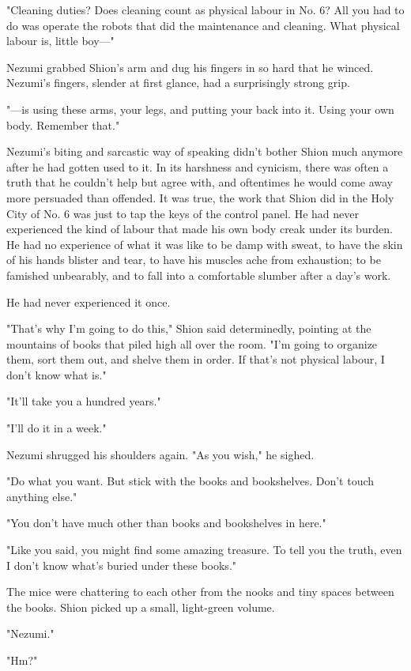 "Cleaning duties? Does cleaning count as physical labour in No. 6? All
you had to do was operate the robots that did the maintenance and
cleaning. What physical labour is, little boy---"

Nezumi grabbed Shion's arm and dug his fingers in so hard that he
winced. Nezumi's fingers, slender at first glance, had a surprisingly
strong grip.

"---is using these arms, your legs, and putting your back into it. Using
your own body. Remember that."

Nezumi's biting and sarcastic way of speaking didn't bother Shion much
anymore after he had gotten used to it. In its harshness and cynicism,
there was often a truth that he couldn't help but agree with, and
oftentimes he would come away more persuaded than offended. It was true,
the work that Shion did in the Holy City of No. 6 was just to tap the
keys of the control panel. He had never experienced the kind of labour
that made his own body creak under its burden. He had no experience of
what it was like to be damp with sweat, to have the skin of his hands
blister and tear, to have his muscles ache from exhaustion; to be
famished unbearably, and to fall into a comfortable slumber after a
day's work.

He had never experienced it once.

"That's why I'm going to do this," Shion said determinedly, pointing at
the mountains of books that piled high all over the room. "I'm going to
organize them, sort them out, and shelve them in order. If that's not
physical labour, I don't know what is."

"It'll take you a hundred years."

"I'll do it in a week."

Nezumi shrugged his shoulders again. "As you wish," he sighed.

"Do what you want. But stick with the books and bookshelves. Don't touch
anything else."

"You don't have much other than books and bookshelves in here."

"Like you said, you might find some amazing treasure. To tell you the
truth, even I don't know what's buried under these books."

The mice were chattering to each other from the nooks and tiny spaces
between the books. Shion picked up a small, light-green volume.

"Nezumi."

"Hm?"

